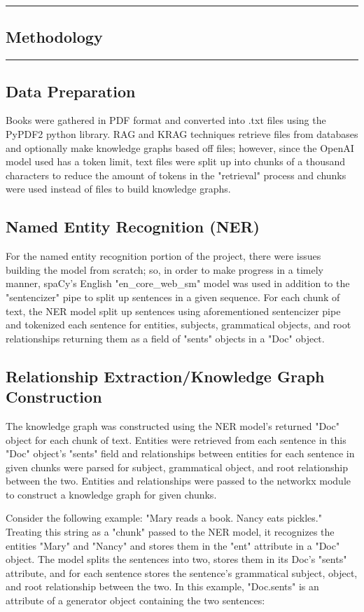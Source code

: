 {\color{gray}\hrule}
\begin{center}
\section{Methodology}
\bigskip
\end{center}
{\color{gray}\hrule}
\subsection{Data Preparation}

Books were gathered in PDF format and converted into .txt files using the PyPDF2 python library. RAG and KRAG techniques retrieve files from databases and optionally make knowledge graphs based off files; however, since the OpenAI model used has a token limit,  text files were split up into chunks of a thousand characters to reduce the amount of tokens in the "retrieval" process and chunks were used instead of files to build knowledge graphs.

\subsection{Named Entity Recognition (NER)}

For the named entity recognition portion of the project, there were issues building the model from scratch; so, in order to make progress in a timely manner, spaCy's English "en\_core\_web\_sm" model was used in addition to the "sentencizer" pipe to split up sentences in a given sequence. For each chunk of text, the NER model split up sentences using aforementioned sentencizer pipe and tokenized each sentence for entities, subjects, grammatical objects, and root relationships returning them as a field of "sents" objects in a "Doc" object.

\subsection{Relationship Extraction/Knowledge Graph Construction}

The knowledge graph was constructed using the NER model's returned "Doc" object for each chunk of text. Entities were retrieved from each sentence in this "Doc" object's "sents" field and relationships between entities for each sentence in given chunks were parsed for subject, grammatical object, and root relationship between the two. Entities and relationships were passed to the networkx module to construct a knowledge graph for given chunks. \par
Consider the following example: "Mary reads a book. Nancy eats pickles." Treating this string as a "chunk" passed to the NER model, it recognizes the entities "Mary" and "Nancy" and stores them in the "ent" attribute in a "Doc" object. The model splits the sentences into two, stores them in its Doc's "sents" attribute, and for each sentence stores the sentence's grammatical subject, object, and root relationship between the two. In this example, "Doc.sents" is an attribute of a generator object containing the two sentences: \bigskip

